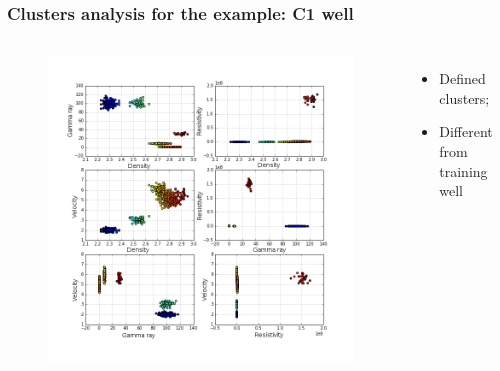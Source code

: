 \documentclass[aspectratio=10]{beamer} %
\begin{document}
\begin{frame}
\frametitle{Clusters analysis for the example: C1 well}

     \begin{columns}
     	\footnotesize
     	\justifying
     	\begin{figure}
      		\includegraphics[scale=0.268]{Imagens/cluterpocoC1.png}
      	\end{figure}
      	
      	\begin{itemize}
      		\footnotesize
      		\item Defined clusters;
      		\pause
      		\item Different from training well
    	\end{itemize}
      	
      \end{columns}
\end{frame}
\end{document}
